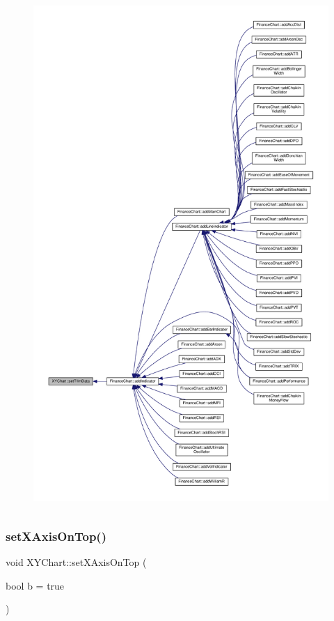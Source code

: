 \begin{figure}[H]
\begin{center}
\leavevmode
\includegraphics[height=550pt]{class_x_y_chart_a3fed05334f9e4b6e0a9487dadd8cc5dd_icgraph}
\end{center}
\end{figure}
\mbox{\label{class_x_y_chart_a7cca8475736683fec321ed407b93771b}} 
\subsubsection{\texorpdfstring{set\+X\+Axis\+On\+Top()}{setXAxisOnTop()}}
{\footnotesize\ttfamily void X\+Y\+Chart\+::set\+X\+Axis\+On\+Top (\begin{DoxyParamCaption}\item[{bool}]{b = {\ttfamily true} }\end{DoxyParamCaption})\hspace{0.3cm}{\ttfamily [inline]}}




